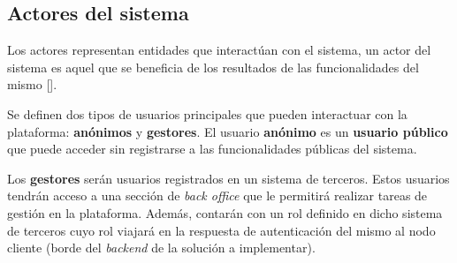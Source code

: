 

\subsection{Actores del sistema}
Los actores representan entidades que interactúan con el sistema, un actor del sistema es aquel que se beneficia de los resultados de las funcionalidades del mismo [\cite{91}]. 

Se definen dos tipos de usuarios principales que pueden interactuar con la plataforma: \textbf{anónimos} y \textbf{gestores}. El usuario \textbf{anónimo} es un \textbf{usuario público} que puede acceder sin registrarse a las funcionalidades públicas del sistema.

Los \textbf{gestores} serán usuarios registrados en un sistema de terceros. Estos usuarios tendrán acceso a una sección de \textit{back office} que le permitirá realizar tareas de gestión en la plataforma. Además, contarán con un rol definido en dicho sistema de terceros cuyo rol viajará en la respuesta de autenticación del mismo al nodo cliente (borde del \textit{backend} de la solución a implementar).

